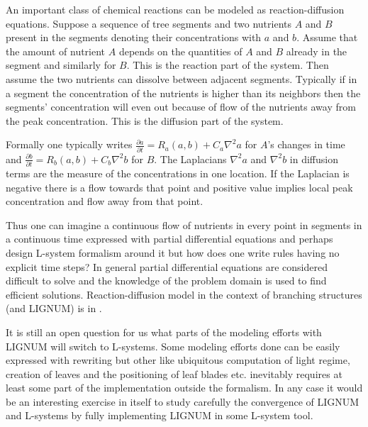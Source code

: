 An  important   class  of  chemical   reactions  can  be   modeled  as
reaction-diffusion equations. Suppose a  sequence of tree segments and
two  nutrients $A$  and $B$  present  in the  segments denoting  their
concentrations with $a$  and $b$.  Assume that the  amount of nutrient
$A$ depends  on the quantities of  $A$ and $B$ already  in the segment
and similarly for $B$.  This is  the reaction part of the system. Then
assume  the  two nutrients  can  dissolve  between adjacent  segments.
Typically if in a segment the concentration of the nutrients is higher
than  its neighbors  then the  segments' concentration  will  even out
because of  flow of  the nutrients away  from the  peak concentration.
This  is the  diffusion part  of the  system.  

Formally  one  typically   writes  $\frac{\partial  a}{\partial  t}  =
R_a(a,b) + C_a\nabla^2a$ for $A$'s changes in time and $\frac{\partial
  b}{\partial t}  = R_b(a,b) + C_b\nabla^2b$ for  $B$.  The Laplacians
$\nabla^2 a$ and $\nabla^2 b$ \citep{thomas:92} in diffusion terms are
the measure of  the concentrations in one location.   If the Laplacian
is  negative there is  a flow  towards that  point and  positive value
implies local peak concentration and flow away from that point.

Thus one can imagine a continuous  flow of nutrients in every point in
segments  in a  continuous  time expressed  with partial  differential
equations and perhaps design L-system formalism around it but how does
one write  rules having  no explicit time  steps?  In  general partial
differential  equations  are considered  difficult  to  solve and  the
knowledge of the  problem domain is used to  find efficient solutions.
Reaction-diffusion model  in the context of  branching structures (and
LIGNUM) is in \citet{palovaara:03}. 

It is still an open question for us what parts of the modeling efforts
with LIGNUM will switch to  L-systems.  Some modeling efforts done can
be  easily   expressed  with  rewriting  but   other  like  ubiquitous
computation of light regime, creation of leaves and the positioning of
leaf  blades etc.   inevitably  requires  at least  some  part of  the
implementation  outside the  formalism.  In  any case  it would  be an
interesting exercise  in itself to study carefully  the convergence of
LIGNUM  and L-systems by  fully implementing  LIGNUM in  some L-system
tool.

